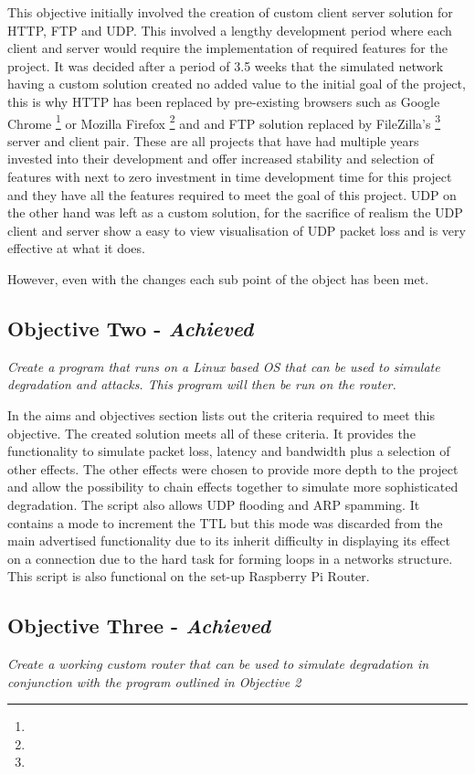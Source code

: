 This objective initially involved the creation of custom client server solution for HTTP, FTP and UDP. This involved a lengthy development period where each client and server would require the implementation of required features for the project. It was decided after a period of 3.5 weeks that the simulated network having a custom solution created no added value to the initial goal of the project, this is why HTTP has been replaced by pre-existing browsers such as Google Chrome \footnote{\chromeUrl} or Mozilla Firefox \footnote{\firefoxUrl} and and FTP solution replaced by FileZilla's \footnote{\fileZillaUrl} server and client pair. These are all projects that have had multiple years invested into their development and offer increased stability and selection of features with next to zero investment in time development time for this project and they have all the features required to meet the goal of this project. UDP on the other hand was left as a custom solution, for the sacrifice of realism the UDP client and server show a easy to view visualisation of UDP packet loss and is very effective at what it does.

However, even with the changes each sub point of the object has been met.

\subsection{Objective Two - {\it Achieved}}
{\it Create a program that runs on a Linux based OS that can be used to simulate degradation and attacks. This program will then be run on the router.}

In the aims and objectives section lists out the criteria required to meet this objective. The created solution meets all of these criteria. It provides the functionality to simulate packet loss, latency and bandwidth plus a selection of other effects. The other effects were chosen to provide more depth to the project and allow the possibility to chain effects together to simulate more sophisticated degradation. The script also allows UDP flooding and ARP spamming. It contains a mode to increment the TTL but this mode was discarded from the main advertised functionality due to its inherit difficulty in displaying its effect on a connection due to the hard task for forming loops in a networks structure. This script is also functional on the set-up Raspberry Pi Router.


\subsection{Objective Three - {\it Achieved}}
{\it Create a working custom router that can be used to simulate degradation in conjunction with the program outlined in Objective 2}

